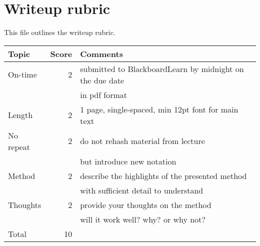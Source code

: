 \documentclass[10pt]{article}
\begin{document}
\chead[\fancyplain{} {}]   {\fancyplain{}{}}

\section*{Writeup rubric}

This file outlines the writeup rubric.

\begin{tabular}{|l|r|l|}
\hline
Topic & \multicolumn{1}{l|}{Score} & Comments \\
\hline
On-time   & 2 & submitted to BlackboardLearn by midnight on the due date \\
&& in pdf format \\
\hline
Length & 2 & 1 page, single-spaced, min 12pt font for main text \\ 
\hline
No repeat   & 2 & do not rehash material from lecture \\
&& but introduce new notation \\
\hline
Method  & 2 & describe the highlights of the presented method \\
&& with sufficient detail to understand \\
\hline
Thoughts  & 2 & provide your thoughts on the method \\
&& will it work well? why? or why not? \\
\hline
Total &10 &\\
\hline
\end{tabular}
\end{document}
